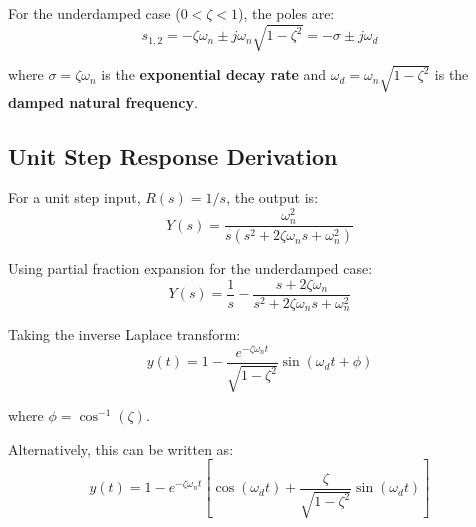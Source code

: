 For the underdamped case ($0 < \zeta < 1$), the poles are:
\begin{equation}
    s_{1,2} = -\zeta\omega_n \pm j\omega_n\sqrt{1 - \zeta^2} = -\sigma \pm j\omega_d
\end{equation}

where $\sigma = \zeta\omega_n$ is the \textbf{exponential decay rate} and $\omega_d = \omega_n\sqrt{1-\zeta^2}$ is the \textbf{damped natural frequency}.

\subsection{Unit Step Response Derivation}

For a unit step input, $R(s) = 1/s$, the output is:
\begin{equation}
    Y(s) = \frac{\omega_n^2}{s(s^2 + 2\zeta\omega_n s + \omega_n^2)}
\end{equation}

Using partial fraction expansion for the underdamped case:
\begin{equation}
    Y(s) = \frac{1}{s} - \frac{s + 2\zeta\omega_n}{s^2 + 2\zeta\omega_n s + \omega_n^2}
\end{equation}

Taking the inverse Laplace transform:
\begin{equation}
    y(t) = 1 - \frac{e^{-\zeta\omega_n t}}{\sqrt{1-\zeta^2}}\sin(\omega_d t + \phi)
    \label{eq:step_response}
\end{equation}

where $\phi = \cos^{-1}(\zeta)$.

Alternatively, this can be written as:
\begin{equation}
    y(t) = 1 - e^{-\zeta\omega_n t}\left[\cos(\omega_d t) + \frac{\zeta}{\sqrt{1-\zeta^2}}\sin(\omega_d t)\right]
    \label{eq:step_response_alt}
\end{equation}

